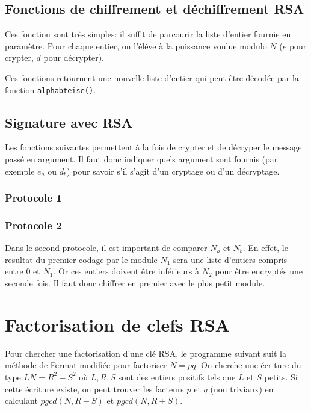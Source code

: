\documentclass[titlepage]{article}
\begin{document}
    

    \subsection{Fonctions de chiffrement et déchiffrement RSA}
    Ces fonction sont très simples: il suffit de parcourir la liste d'entier fournie en paramètre. Pour chaque entier, on l'éléve à la puissance voulue modulo $N$ ($e$ pour crypter, $d$ pour décrypter).

    

    

    Ces fonctions retournent une nouvelle liste d'entier qui peut être décodée par la fonction \texttt{alphabteise()}.

    \subsection{Signature avec RSA}
    Les fonctions suivantes permettent à la fois de crypter et de décryper le message passé en argument. 
    Il faut donc indiquer quels argument sont fournis (par exemple $e_a$ ou $d_b$) pour savoir s'il s'agit d'un cryptage ou d'un décryptage.
    \subsubsection{Protocole 1}

    

    \subsubsection{Protocole 2}

    

    Dans le second protocole, il est important de comparer $N_a$ et $N_b$. En effet, le resultat du premier codage par le module $N_1$ sera une liste d'entiers compris entre 0 et $N_1$. Or ces entiers doivent être inférieurs à $N_2$ pour être encryptés une seconde fois. Il faut donc chiffrer en premier avec le plus petit module.


    \section{Factorisation de clefs RSA}
    Pour chercher une factorisation d'une clé RSA, le programme suivant suit la méthode de Fermat modifiée pour factoriser $N = pq$.
    On cherche une écriture du type $LN = R^2 - S^2$ où $L,R,S$ sont des entiers positifs tels que $L$ et $S$ petits.
    Si cette écriture existe, on peut trouver les facteurs $p$ et $q$ (non triviaux) en calculant $pgcd(N,R-S)$ et $ pgcd(N,R+S)$.
\end{document}
